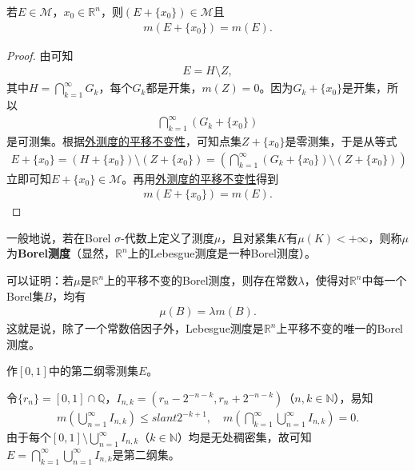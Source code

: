\documentclass[../../main.tex]{subfiles}
\begin{document}
\begin{theorem}
若\(E \in \mathscr{M}\)，\(x_0 \in \mathbb{R}^n\)，则\((E + \{x_0\}) \in \mathscr{M}\)且
\begin{align*}
m(E + \{x_0\}) = m(E).
\end{align*}
\end{theorem}
\begin{proof}
由可知
\begin{align*}
E = H \setminus Z,
\end{align*}
其中\(H = \bigcap_{k = 1}^{\infty} G_k\)，每个\(G_k\)都是开集，\(m(Z) = 0\)。因为\(G_k + \{x_0\}\)是开集，所以
\begin{align*}
\bigcap_{k = 1}^{\infty} (G_k + \{x_0\})
\end{align*}
是可测集。根据\hyperref[theorem:外测度的平移不变性]{外测度的平移不变性}，可知点集\(Z + \{x_0\}\)是零测集，于是从等式
\begin{align*}
E + \{x_0\}= (H + \{x_0\}) \setminus (Z + \{x_0\})
= \left(\bigcap_{k = 1}^{\infty} (G_k + \{x_0\}) \setminus (Z + \{x_0\})\right)
\end{align*}
立即可知\(E + \{x_0\} \in \mathscr{M}\)。再用\hyperref[theorem:外测度的平移不变性]{外测度的平移不变性}得到
\begin{align*}
m(E + \{x_0\}) = m(E).
\end{align*}
\end{proof}
\begin{remark}
一般地说，若在Borel \(\sigma\)-代数上定义了测度\(\mu\)，且对紧集\(K\)有\(\mu(K)<+\infty\)，则称\(\mu\)为\textbf{Borel测度}（显然，\(\mathbb{R}^n\)上的Lebesgue测度是一种Borel测度）。

可以证明：若\(\mu\)是\(\mathbb{R}^n\)上的平移不变的Borel测度，则存在常数\(\lambda\)，使得对\(\mathbb{R}^n\)中每一个Borel集\(B\)，均有
\begin{align*}
\mu(B)=\lambda m(B).
\end{align*}
这就是说，除了一个常数倍因子外，Lebesgue测度是\(\mathbb{R}^n\)上平移不变的唯一的Borel测度。 
\end{remark}

\begin{example}
作\([0,1]\)中的第二纲零测集\(E\)。
\end{example}
\begin{solution}
令\(\{r_n\}=[0,1]\cap\mathbb{Q}\)，\(I_{n,k}=(r_n - 2^{-n - k},r_n + 2^{-n - k})\)（\(n,k\in\mathbb{N}\)），易知
\begin{align*}
m\left(\bigcup_{n = 1}^{\infty}I_{n,k}\right)\leqslant slant 2^{-k + 1},\quad
m\left(\bigcap_{k = 1}^{\infty}\bigcup_{n = 1}^{\infty}I_{n,k}\right)= 0.
\end{align*}
由于每个\([0,1]\setminus\bigcup_{n = 1}^{\infty}I_{n,k}\)（\(k\in\mathbb{N}\)）均是无处稠密集，故可知\(E = \bigcap_{k = 1}^{\infty}\bigcup_{n = 1}^{\infty}I_{n,k}\)是第二纲集。
\end{solution}
\end{document}
